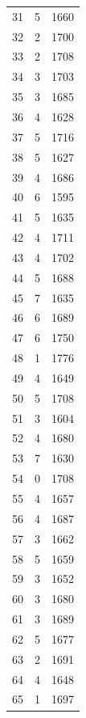 \documentclass[twocolumn, 11pt]{article} %
\begin{document}
\begin{longtable}{lll}
31        & 5        & 1660     \\
32        & 2        & 1700     \\
33        & 2        & 1708     \\
34        & 3        & 1703     \\
35        & 3        & 1685     \\
36        & 4        & 1628     \\
37        & 5        & 1716     \\
38        & 5        & 1627     \\
39        & 4        & 1686     \\
40        & 6        & 1595     \\
41        & 5        & 1635     \\
42        & 4        & 1711     \\
43        & 4        & 1702     \\
44        & 5        & 1688     \\
45        & 7        & 1635     \\
46        & 6        & 1689     \\
47        & 6        & 1750     \\
48        & 1        & 1776     \\
49        & 4        & 1649     \\
50        & 5        & 1708     \\
51        & 3        & 1604     \\
52        & 4        & 1680     \\
53        & 7        & 1630     \\
54        & 0        & 1708     \\
55        & 4        & 1657     \\
56        & 4        & 1687     \\
57        & 3        & 1662     \\
58        & 5        & 1659     \\
59        & 3        & 1652     \\
60        & 3        & 1680     \\
61        & 3        & 1689     \\
62        & 5        & 1677     \\
63        & 2        & 1691     \\
64        & 4        & 1648     \\
65        & 1        & 1697     \\

\end{longtable}
\end{document}
